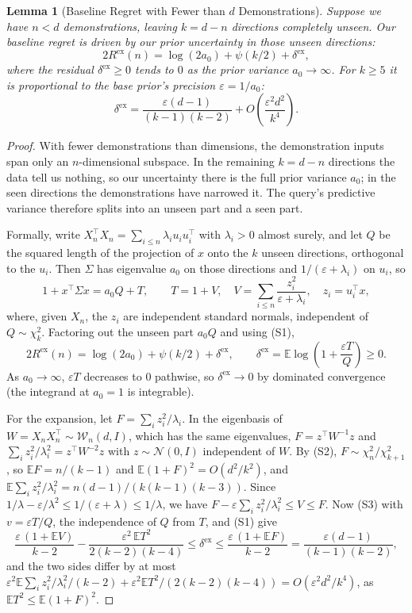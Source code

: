 \documentclass{article}
\newtheorem{lemma}{Lemma}[section]
\newcommand{\E}{\mathbb{E}}
\begin{document}
\begin{lemma}[Baseline Regret with Fewer than $d$ Demonstrations]\label{lem:few}
Suppose we have $n < d$ demonstrations, leaving $k = d - n$ directions completely unseen. Our baseline regret is driven by our prior uncertainty in those unseen directions:
\[
2R^{\mathrm{ex}}(n) = \log(2a_0) + \psi(k/2) + \delta^{\mathrm{ex}},
\]
where the residual $\delta^{\mathrm{ex}} \ge 0$ tends to $0$ as the prior variance $a_0 \to \infty$. For $k \ge 5$ it is proportional to the base prior's precision $\varepsilon = 1/a_0$:
\[
\delta^{\mathrm{ex}} = \frac{\varepsilon (d-1)}{(k-1)(k-2)} + O\!\left(\frac{\varepsilon^2 d^2}{k^4}\right).
\]
\end{lemma}

\begin{proof}
With fewer demonstrations than dimensions, the demonstration inputs span only an $n$-dimensional subspace. In the remaining $k = d - n$ directions the data tell us nothing, so our uncertainty there is the full prior variance $a_0$; in the seen directions the demonstrations have narrowed it. The query's predictive variance therefore splits into an unseen part and a seen part.

Formally, write $X_n^\top X_n = \sum_{i \le n} \lambda_i u_i u_i^\top$ with $\lambda_i > 0$ almost surely, and let $Q$ be the squared length of the projection of $x$ onto the $k$ unseen directions, orthogonal to the $u_i$. Then $\Sigma$ has eigenvalue $a_0$ on those directions and $1/(\varepsilon + \lambda_i)$ on $u_i$, so
\[
1 + x^\top \Sigma x = a_0 Q + T, \qquad T = 1 + V, \quad V = \sum_{i \le n} \frac{z_i^2}{\varepsilon + \lambda_i}, \quad z_i = u_i^\top x,
\]
where, given $X_n$, the $z_i$ are independent standard normals, independent of $Q \sim \chi^2_k$. Factoring out the unseen part $a_0 Q$ and using (S1),
\[
2R^{\mathrm{ex}}(n) = \log(2a_0) + \psi(k/2) + \delta^{\mathrm{ex}}, \qquad \delta^{\mathrm{ex}} = \E \log\!\left(1 + \frac{\varepsilon T}{Q}\right) \ge 0 .
\]
As $a_0 \to \infty$, $\varepsilon T$ decreases to $0$ pathwise, so $\delta^{\mathrm{ex}} \to 0$ by dominated convergence (the integrand at $a_0 = 1$ is integrable).

For the expansion, let $F = \sum_i z_i^2 / \lambda_i$. In the eigenbasis of $W = X_n X_n^\top \sim \mathcal{W}_n(d, I)$, which has the same eigenvalues, $F = z^\top W^{-1} z$ and $\sum_i z_i^2/\lambda_i^2 = z^\top W^{-2} z$ with $z \sim \mathcal{N}(0, I)$ independent of $W$. By (S2), $F \sim \chi^2_n / \chi^2_{k+1}$, so $\E F = n/(k-1)$ and $\E (1+F)^2 = O(d^2/k^2)$, and $\E \sum_i z_i^2/\lambda_i^2 = n(d-1)/(k(k-1)(k-3))$. Since $1/\lambda - \varepsilon/\lambda^2 \le 1/(\varepsilon + \lambda) \le 1/\lambda$, we have $F - \varepsilon \sum_i z_i^2/\lambda_i^2 \le V \le F$. Now (S3) with $v = \varepsilon T / Q$, the independence of $Q$ from $T$, and (S1) give
\[
\frac{\varepsilon\,(1 + \E V)}{k-2} - \frac{\varepsilon^2\, \E T^2}{2(k-2)(k-4)} \le \delta^{\mathrm{ex}} \le \frac{\varepsilon\,(1 + \E F)}{k-2} = \frac{\varepsilon (d-1)}{(k-1)(k-2)} ,
\]
and the two sides differ by at most $\varepsilon^2 \E \sum_i z_i^2/\lambda_i^2 /(k-2) + \varepsilon^2 \E T^2 / (2(k-2)(k-4)) = O(\varepsilon^2 d^2 / k^4)$, as $\E T^2 \le \E (1 + F)^2$.
\end{proof}
\end{document}
